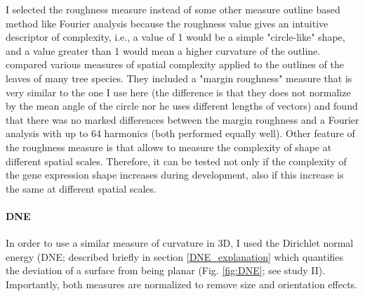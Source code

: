 I selected the roughness measure instead of some other measure outline based method like Fourier analysis because the roughness value gives an intuitive descriptor of complexity, i.e., a value of 1 would be a simple "circle-like" shape, and a value greater than 1 would mean a higher curvature of the outline. \citet{McLellan1998} compared various measures of spatial complexity applied to the outlines of the leaves of many tree species. They included a "margin roughness" measure that is very similar to the one I use here (the difference is that they does not normalize by the mean angle of the circle nor he uses different lengths of vectors) and found that there was no marked differences between the margin roughness and a Fourier analysis with up to 64 harmonics (both performed equally well).
Other feature of the roughness measure is that allows to measure the complexity of shape at different spatial scales. Therefore, it can be tested not only if the complexity of the gene expression shape increases during development, also if this increase is the same at different spatial scales.

\paragraph{DNE}
In order to use a similar measure of curvature in 3D, I used the Dirichlet normal energy (DNE; described briefly in section \ref{DNE_explanation} which quantifies the deviation of a surface from being planar (Fig. \ref{fig:DNE}; see study II). 
Importantly, both measures are normalized to remove size and orientation effects.


